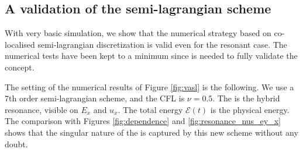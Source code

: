 

\FloatBarrier

\subsection{A validation of the semi-lagrangian scheme}

With very basic simulation, we show that the numerical strategy 
based on co-localised semi-lagrangian discretization is valid even for the resonant 
case.
The numerical tests have been kept to a minimum since  is needed to fully validate
the concept.

The setting of the numerical results of Figure \ref{fig:vasl}
is the following. We use a 7th order semi-lagrangian scheme, and the CFL is $\nu=0.5$.
The  is the hybrid resonance, visible on $E_x$ and $u_x$.
The total energy $\mathcal E(t)$ is the physical energy. 
The comparison with Figures \ref{fig:dependence} and \ref{fig:resonance_nus_ey_x} shows that the 
singular nature of the  is captured by this new scheme without any doubt.


